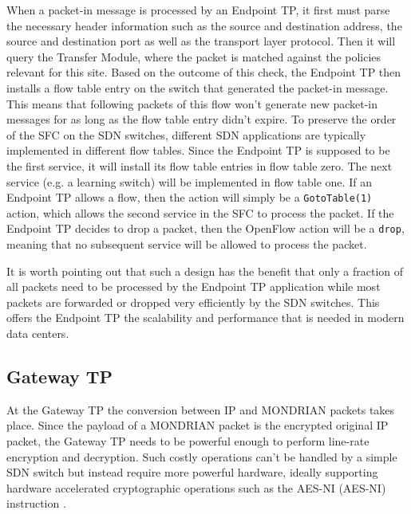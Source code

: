 When a packet-in message is processed by an Endpoint TP, it first must parse the necessary header information such as the source and destination address, the source and destination port as well as the transport layer protocol. Then it will query the Transfer Module, where the packet is matched against the policies relevant for this site. Based on the outcome of this check, the Endpoint \acs{TP} then installs a flow table entry on the switch that generated the packet-in message. This means that following packets of this flow won't generate new packet-in messages for as long as the flow table entry didn't expire. To preserve the order of the \acs{SFC} on the \acs{SDN} switches, different \acs{SDN} applications are typically implemented in different flow tables. Since the Endpoint \acs{TP} is supposed to be the first service, it will install its flow table entries in flow table zero. The next service (e.g. a learning switch) will be implemented in flow table one. If an Endpoint \acs{TP} allows a flow, then the action will simply be a \texttt{GotoTable(1)} action, which allows the second service in the \acs{SFC} to process the packet. If the Endpoint \acs{TP} decides to drop a packet, then the OpenFlow action will be a \texttt{drop}, meaning that no subsequent service will be allowed to process the packet. 

It is worth pointing out that such a design has the benefit that only a fraction of all packets need to be processed by the Endpoint \acs{TP} application while most packets are forwarded or dropped very efficiently by the \acs{SDN} switches. This offers the Endpoint \acs{TP} the scalability and performance that is needed in modern data centers.
%
\subsection{Gateway TP}
At the Gateway \acs{TP} the conversion between \acs{IP} and MONDRIAN packets takes place. Since the payload of a MONDRIAN packet is the encrypted original \acs{IP} packet, the Gateway \acs{TP} needs to be powerful enough to perform line-rate encryption and decryption. Such costly operations can't be handled by a simple \acs{SDN} switch but instead require more powerful hardware, ideally supporting hardware accelerated cryptographic operations such as the \acs{AES-NI} (\acl{AES-NI}) instruction \cite{rott2012AESNI}.

